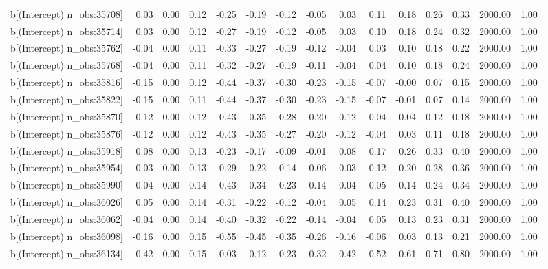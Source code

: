 \begin{table}[ht]
\begin{tabular}{rrrrrrrrrrrrrrr}
  b[(Intercept) n\_obs:35708] & 0.03 & 0.00 & 0.12 & -0.25 & -0.19 & -0.12 & -0.05 & 0.03 & 0.11 & 0.18 & 0.26 & 0.33 & 2000.00 & 1.00 \\ 
  b[(Intercept) n\_obs:35714] & 0.03 & 0.00 & 0.12 & -0.27 & -0.19 & -0.12 & -0.05 & 0.03 & 0.10 & 0.18 & 0.24 & 0.32 & 2000.00 & 1.00 \\ 
  b[(Intercept) n\_obs:35762] & -0.04 & 0.00 & 0.11 & -0.33 & -0.27 & -0.19 & -0.12 & -0.04 & 0.03 & 0.10 & 0.18 & 0.22 & 2000.00 & 1.00 \\ 
  b[(Intercept) n\_obs:35768] & -0.04 & 0.00 & 0.11 & -0.32 & -0.27 & -0.19 & -0.11 & -0.04 & 0.04 & 0.10 & 0.18 & 0.24 & 2000.00 & 1.00 \\ 
  b[(Intercept) n\_obs:35816] & -0.15 & 0.00 & 0.12 & -0.44 & -0.37 & -0.30 & -0.23 & -0.15 & -0.07 & -0.00 & 0.07 & 0.15 & 2000.00 & 1.00 \\ 
  b[(Intercept) n\_obs:35822] & -0.15 & 0.00 & 0.11 & -0.44 & -0.37 & -0.30 & -0.23 & -0.15 & -0.07 & -0.01 & 0.07 & 0.14 & 2000.00 & 1.00 \\ 
  b[(Intercept) n\_obs:35870] & -0.12 & 0.00 & 0.12 & -0.43 & -0.35 & -0.28 & -0.20 & -0.12 & -0.04 & 0.04 & 0.12 & 0.18 & 2000.00 & 1.00 \\ 
  b[(Intercept) n\_obs:35876] & -0.12 & 0.00 & 0.12 & -0.43 & -0.35 & -0.27 & -0.20 & -0.12 & -0.04 & 0.03 & 0.11 & 0.18 & 2000.00 & 1.00 \\ 
  b[(Intercept) n\_obs:35918] & 0.08 & 0.00 & 0.13 & -0.23 & -0.17 & -0.09 & -0.01 & 0.08 & 0.17 & 0.26 & 0.33 & 0.40 & 2000.00 & 1.00 \\ 
  b[(Intercept) n\_obs:35954] & 0.03 & 0.00 & 0.13 & -0.29 & -0.22 & -0.14 & -0.06 & 0.03 & 0.12 & 0.20 & 0.28 & 0.36 & 2000.00 & 1.00 \\ 
  b[(Intercept) n\_obs:35990] & -0.04 & 0.00 & 0.14 & -0.43 & -0.34 & -0.23 & -0.14 & -0.04 & 0.05 & 0.14 & 0.24 & 0.34 & 2000.00 & 1.00 \\ 
  b[(Intercept) n\_obs:36026] & 0.05 & 0.00 & 0.14 & -0.31 & -0.22 & -0.12 & -0.04 & 0.05 & 0.14 & 0.23 & 0.31 & 0.40 & 2000.00 & 1.00 \\ 
  b[(Intercept) n\_obs:36062] & -0.04 & 0.00 & 0.14 & -0.40 & -0.32 & -0.22 & -0.14 & -0.04 & 0.05 & 0.13 & 0.23 & 0.31 & 2000.00 & 1.00 \\ 
  b[(Intercept) n\_obs:36098] & -0.16 & 0.00 & 0.15 & -0.55 & -0.45 & -0.35 & -0.26 & -0.16 & -0.06 & 0.03 & 0.13 & 0.21 & 2000.00 & 1.00 \\ 
  b[(Intercept) n\_obs:36134] & 0.42 & 0.00 & 0.15 & 0.03 & 0.12 & 0.23 & 0.32 & 0.42 & 0.52 & 0.61 & 0.71 & 0.80 & 2000.00 & 1.00 \\ 

\end{tabular}
\end{table}

